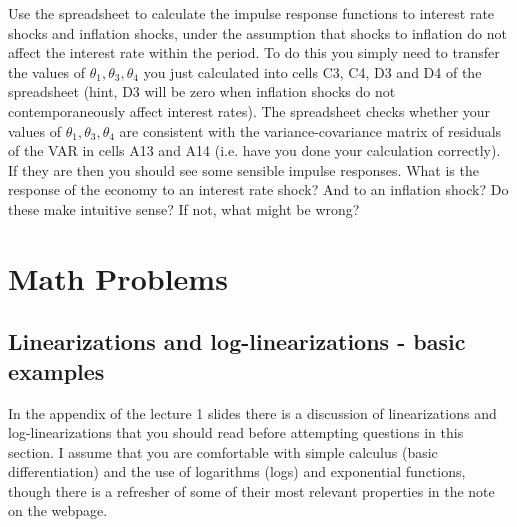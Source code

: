 \documentclass[authoryear,11pt]{elsarticle}
\begin{document}
Use the spreadsheet to calculate the impulse response functions to interest rate shocks and inflation shocks, under the assumption that shocks
to inflation do not affect the interest rate within the period. To do this you simply need to transfer the values of $\theta _{1},\theta _{3},\theta_{4}$ you just calculated into cells C3, C4, D3 and D4 of the spreadsheet (hint, D3 will be zero when inflation shocks do not contemporaneously affect interest rates). The spreadsheet checks whether your values of $\theta _{1},\theta _{3},\theta _{4}$ are consistent with the variance-covariance matrix of residuals of the VAR in cells A13 and A14 (i.e. have you done your calculation correctly). If they are then you should see some sensible impulse responses. What is the response of the economy to an interest rate shock? And to an inflation shock? Do these make intuitive sense? If not, what might be wrong?
%
%
%

\section{Math Problems}

\subsection{Linearizations and log-linearizations - basic examples}
In the appendix of the lecture 1 slides there is a discussion of linearizations and log-linearizations that you should read before attempting questions in this section. I assume that you are comfortable with simple calculus (basic differentiation) and the use of logarithms (logs) and exponential functions, though there is a refresher of some of their most relevant properties in the note on the webpage.
\end{document}
